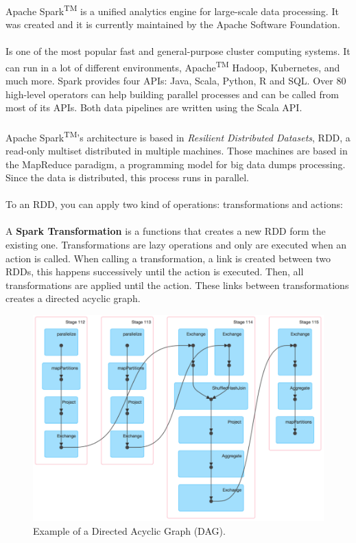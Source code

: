 Apache Spark\textsuperscript{TM} is a unified analytics engine for large-scale data processing. It was created and it is currently maintained by the Apache Software Foundation\cite{apache_software_foundation}.
\\\\
Is one of the most popular fast and general-purpose cluster computing systems. It can run in a lot of different environments, Apache\textsuperscript{TM} Hadoop\textregistered\cite{hadoop}, Kubernetes\cite{k8s},  and much more. Spark provides four APIs: Java, Scala, Python, R and SQL. Over 80 high-level operators can help building parallel processes and can be called from most of its APIs. Both data pipelines are written using the Scala API.
\\\\
Apache Spark\textsuperscript{TM}'s architecture is based in \textit{Resilient Distributed Datasets}, RDD, a read-only multiset distributed in multiple machines. Those machines are based in the MapReduce paradigm, a programming model for big data dumps processing. Since the data is distributed, this process runs in parallel.
\\\\
To an RDD, you can apply two kind of operations: transformations and actions:
\\\\
A \textbf{Spark Transformation} is a functions that creates a new RDD form the existing one. Transformations are lazy operations and only are executed when an action is called. When calling a transformation, a link is created between two RDDs, this happens successively until the action is executed. Then, all transformations are applied until the action. These links between transformations creates a directed acyclic graph.

\begin{figure}[H]
\centering
\includegraphics[scale=0.3]{resources/dag.png}
\caption{Example of a Directed Acyclic Graph (DAG).}
\end{figure}

